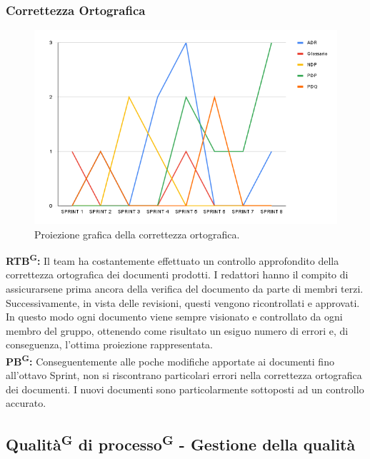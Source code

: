 \documentclass[8pt]{article}
\newcommand{\glossterm}[1]{#1\textsuperscript{G}} %
\begin{document}
\subsubsection{Correttezza Ortografica}
\begin{figure}[h!]
    \centering
    \includegraphics[width=1\textwidth]{images_pdq/CO.png}
    \caption{Proiezione grafica della correttezza ortografica.}
    \label{fig:Proiezione grafica della correttezza ortografica}
\end{figure}
\textbf{\glossterm{RTB}:} Il team ha costantemente effettuato un controllo approfondito della correttezza ortografica dei documenti prodotti. I redattori hanno il compito di assicurarsene prima ancora della verifica del documento da parte di membri terzi. Successivamente, in vista delle revisioni, questi vengono ricontrollati e approvati. In questo modo ogni documento viene sempre visionato e controllato da ogni membro del gruppo, ottenendo come risultato un esiguo numero di errori e, di conseguenza, l'ottima proiezione rappresentata.\\
\textbf{\glossterm{PB}:} Conseguentemente alle poche modifiche apportate ai documenti fino all'ottavo Sprint, non si riscontrano particolari errori nella correttezza ortografica dei documenti. I nuovi documenti sono particolarmente sottoposti ad un controllo accurato.
\clearpage
\subsection{\glossterm{Qualità} di \glossterm{processo} - Gestione della qualità}
\end{document}
